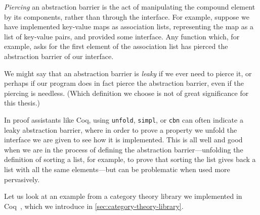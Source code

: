 \emph{Piercing} an abstraction barrier is the act of manipulating the compound element by its components, rather than through the interface.
For example, suppose we have implemented key-value maps as association lists, representing the map as a list of key-value pairs, and provided some interface.
Any function which, for example, asks for the first element of the association list has pierced the abstraction barrier of our interface.

We might say that an abstraction barrier is \emph{leaky} if we ever need to pierce it, or perhaps if our program does in fact pierce the abstraction barrier, even if the piercing is needless.
(Which definition we choose is not of great significance for this thesis.)

In proof assistants like Coq, using \texttt{unfold}, \texttt{simpl}, or \texttt{cbn} can often indicate a leaky abstraction barrier, where in order to prove a property we unfold the interface we are given to see how it is implemented.
This is all well and good when we are in the process of defining the abstraction barrier---unfolding the definition of sorting a list, for example, to prove that sorting the list gives back a list with all the same elements---but can be problematic when used more pervasively.

Let us look at an example from a category theory library we implemented in Coq~\cite{category-coq-experience}, which we introduce in \autoref{sec:category-theory-library}.


\inputminted{coq}{fragments/CategoryExponentialLaws.v}


